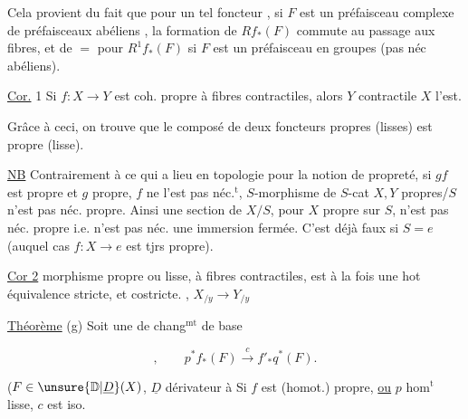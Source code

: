 
Cela provient du fait que pour un tel foncteur ,  si $F$ est un préfaisceau  complexe de préfaisceaux abéliens , la formation de $Rf_* (F)$ commute au passage aux fibres, et de $=$ pour $R^1f_*(F)$ si $F$ est un préfaisceau en groupes (pas néc abéliens).

\uline{Cor.} 1 Si $f:X\longrightarrow Y$ est coh. propre à fibres contractiles, alors $Y$ contractile  $X$ l'est.

Grâce à ceci, on trouve que le composé de deux foncteurs propres (lisses) est propre (lisse).

\uline{NB} Contrairement à ce qui a lieu en topologie pour la notion de propreté, si $gf$ est propre et $g$ propre, $f$ ne l'est pas néc.$^{\mathrm{t}}$,   $S$-morphisme de $S$-cat $X,Y$ propres/$S$ n'est pas néc. propre. Ainsi une section de $X/S$, pour $X$ propre sur $S$, n'est pas néc. propre i.e. n'est pas néc. une immersion fermée. C'est déjà faux si $S=e$ (auquel cas $f:X\longrightarrow e$ est tjrs propre).

\uline{Cor 2}  morphisme propre ou lisse, à fibres contractiles, est à la fois une hot équivalence stricte, et costricte. ,      $X_{/y}\longrightarrow Y_{/y}$

\uline{Théorème} (g) Soit une  de  chang$^{\mathrm{mt}}$ de base  


\[
,\qquad p^*f_*(F)\xrightarrow{c}f'_*q^*(F).
\]

($F\in\unsure{\mathbb D|\underline D}(X)$, $\underline D$ dérivateur  à  Si $f$ est (homot.) propre, \uline{ou} $p$ hom$^{\mathrm{t}}$ lisse,  $c$ est iso.

